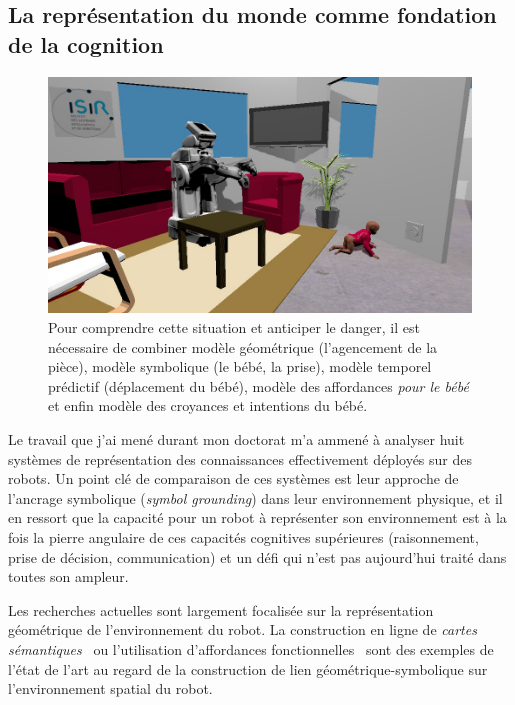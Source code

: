 \documentclass[a4paper]{article}
\begin{document}
\subsection{La représentation du monde comme fondation de la cognition}

\begin{figure}
\includegraphics[width=\textwidth]{figs/robots_home_baby_socket.jpg}
\caption{Pour comprendre cette situation et anticiper le danger, il est
    nécessaire de combiner modèle géométrique (l'agencement de la pièce), modèle
    symbolique (le bébé, la prise), modèle temporel prédictif (déplacement du
    bébé), modèle des affordances \emph{pour le bébé} et enfin modèle des
    croyances et intentions du bébé.}
\label{babyplug}
\end{figure}

Le travail que j'ai mené durant mon doctorat m'a ammené à analyser huit systèmes
de représentation des connaissances effectivement déployés sur des robots. Un
point clé de comparaison de ces systèmes est leur approche de l'ancrage
symbolique (\emph{symbol grounding}) dans leur environnement physique, et il en
ressort que la capacité pour un robot à représenter son environnement est à la
fois la pierre angulaire de ces capacités cognitives supérieures (raisonnement,
prise de décision, communication) et un défi qui n'est pas aujourd'hui traité
dans toutes son ampleur.

Les recherches actuelles sont largement focalisée sur la représentation
géométrique de l'environnement du robot. La construction en ligne de
\emph{cartes sémantiques}~\cite{Nuechter2008, Galindo2008,
Blodow2011} ou l'utilisation d'affordances fonctionnelles~\cite{Varadarajan2011}
sont des exemples de l'état de l'art au regard de la construction de lien
géométrique-symbolique sur l'environnement spatial du robot.
\end{document}
